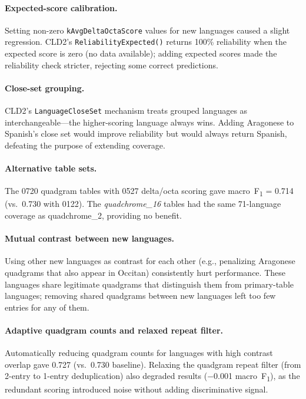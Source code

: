 \documentclass{article}
\newcommand{\fone}{F\textsubscript{1}}
\begin{document}
\paragraph{Expected-score calibration.}
Setting non-zero \texttt{kAvgDeltaOctaScore} values for new languages caused a slight regression.
CLD2's \texttt{ReliabilityExpected()} returns 100\% reliability when the expected score is zero (no data available); adding expected scores made the reliability check stricter, rejecting some correct predictions.

\paragraph{Close-set grouping.}
CLD2's \texttt{LanguageCloseSet} mechanism treats grouped languages as interchangeable---the higher-scoring language always wins.
Adding Aragonese to Spanish's close set would improve reliability but would always return Spanish, defeating the purpose of extending coverage.

\paragraph{Alternative table sets.}
The 0720 quadgram tables with 0527 delta/octa scoring gave macro~\fone{} = 0.714 (vs.\ 0.730 with 0122).
The \emph{quadchrome\_16} tables had the same 71-language coverage as quadchrome\_2, providing no benefit.

\paragraph{Mutual contrast between new languages.}
Using other new languages as contrast for each other (e.g., penalizing Aragonese quadgrams that also appear in Occitan) consistently hurt performance.
These languages share legitimate quadgrams that distinguish them from primary-table languages; removing shared quadgrams between new languages left too few entries for any of them.

\paragraph{Adaptive quadgram counts and relaxed repeat filter.}
Automatically reducing quadgram counts for languages with high contrast overlap gave 0.727 (vs.\ 0.730 baseline).
Relaxing the quadgram repeat filter (from 2-entry to 1-entry deduplication) also degraded results ($-$0.001 macro~\fone{}), as the redundant scoring introduced noise without adding discriminative signal.
\end{document}
